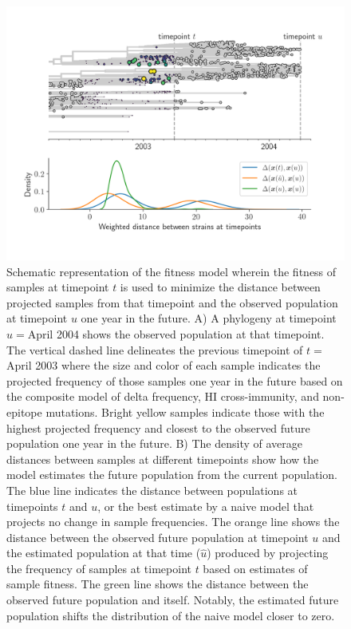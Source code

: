 \begin{figure}[t]
  \begin{center}
  \includegraphics[width=\columnwidth]{figures/distance-based-fitness-model.png}
  \caption{
    Schematic representation of the fitness model wherein the fitness of samples at timepoint $t$ is used to minimize the distance between projected samples from that timepoint and the observed population at timepoint $u$ one year in the future.
    A) A phylogeny at timepoint $u=$April 2004 shows the observed population at that timepoint.
    The vertical dashed line delineates the previous timepoint of $t=$April 2003 where the size and color of each sample indicates the projected frequency of those samples one year in the future based on the composite model of delta frequency, HI cross-immunity, and non-epitope mutations.
    Bright yellow samples indicate those with the highest projected frequency and closest to the observed future population one year in the future.
    B) The density of average distances between samples at different timepoints show how the model estimates the future population from the current population.
    The blue line indicates the distance between populations at timepoints $t$ and $u$, or the best estimate by a naive model that projects no change in sample frequencies.
    The orange line shows the distance between the observed future population at timepoint $u$ and the estimated population at that time ($\hat{u}$) produced by projecting the frequency of samples at timepoint $t$ based on estimates of sample fitness.
    The green line shows the distance between the observed future population and itself.
    Notably, the estimated future population shifts the distribution of the naive model closer to zero.
  }
  \label{fig:model}
  \end{center}
\end{figure}

